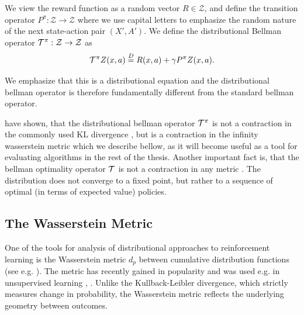 We view the reward function as a random vector $R \in \mathcal{Z}$, and define the transition operator $P^\pi : \mathcal{Z} \to \mathcal{Z}$
where we use capital letters to emphasize the random nature of the next state-action pair $(X', A')$.
We define the distributional Bellman operator $\mathcal{T}^\pi : \mathcal{Z} \to \mathcal{Z}$ as
\begin{equation}
\mathcal{T}^\pi Z(x,a) \overset{D}{=} R(x,a) + \gamma P^\pi Z(x,a).
\end{equation}

We emphasize that this is a distributional equation and the distributional bellman operator is therefore fundamentally different from the standard bellman operator.

\citet{bellemare2017distributional} have shown, that the distributional bellman operator $\mathcal{T}^\pi$ is not a contraction in the commonly used KL divergence \cite{...}, but is a contraction in the infinity wasserstein metric which we describe bellow, as it will become useful as a tool for evaluating algorithms in the rest of the thesis. Another important fact is, that the bellman optimality operator $\mathcal{T}$ is not a contraction in any metric . The distribution does not converge to a fixed point, but rather to a sequence of optimal (in terms of expected value) policies.

\subsection{The Wasserstein Metric}
\newcommand{\pnorm}[1]{\| #1 \|_p}

One of the tools for analysis of distributional approaches to reinforcement learning is the Wasserstein metric $d_p$ between cumulative distribution functions (see e.g. \citet{billingsley2008probability}). The metric has recently gained in popularity and was used e.g. in unsupervised learning \citep{arjovsky2017wasserstein}, \citep{bellemare2017cramer}. Unlike the Kullback-Leibler divergence, which strictly measures change in probability, the Wasserstein metric reflects the underlying geometry between outcomes.

